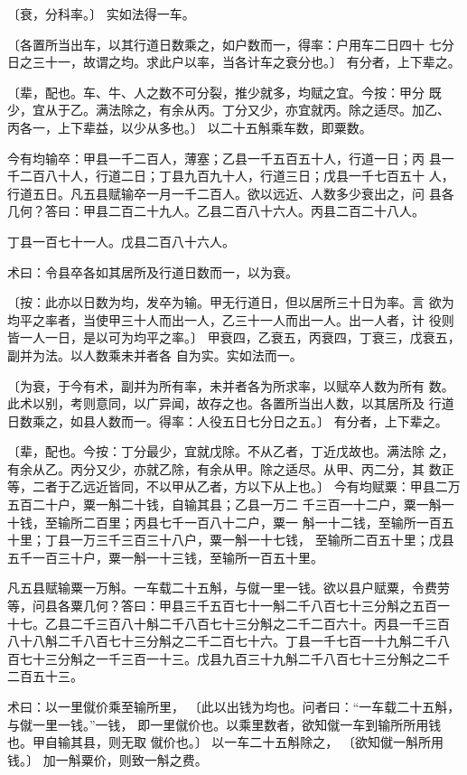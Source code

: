 \documentclass[a4paper,12pt,UTF8,twoside]{ctexbook}
\begin{document}
〔衰，分科率。〕 实如法得一车。

〔各置所当出车，以其行道日数乘之，如户数而一，得率：户用车二日四十 七分日之三十一，故谓之均。求此户以率，当各计车之衰分也。〕 有分者，上下辈之。

〔辈，配也。车、牛、人之数不可分裂，推少就多，均赋之宜。今按：甲分 既少，宜从于乙。满法除之，有余从丙。丁分又少，亦宜就丙。除之适尽。加乙、 丙各一，上下辈益，以少从多也。〕 以二十五斛乘车数，即粟数。

今有均输卒：甲县一千二百人，薄塞；乙县一千五百五十人，行道一日；丙 县一千二百八十人，行道二日；丁县九百九十人，行道三日；戊县一千七百五十 人，行道五日。凡五县赋输卒一月一千二百人。欲以远近、人数多少衰出之，问 县各几何？答曰：甲县二百二十九人。乙县二百八十六人。丙县二百二十八人。

丁县一百七十一人。戊县二百八十六人。

术曰：令县卒各如其居所及行道日数而一，以为衰。

〔按：此亦以日数为均，发卒为输。甲无行道日，但以居所三十日为率。言 欲为均平之率者，当使甲三十人而出一人，乙三十一人而出一人。出一人者，计 役则皆一人一日，是以可为均平之率。〕 甲衰四，乙衰五，丙衰四，丁衰三，戊衰五，副并为法。以人数乘未并者各 自为实。实如法而一。

〔为衰，于今有术，副并为所有率，未并者各为所求率，以赋卒人数为所有 数。此术以别，考则意同，以广异闻，故存之也。各置所当出人数，以其居所及 行道日数乘之，如县人数而一。得率：人役五日七分日之五。〕 有分者，上下辈之。

〔辈，配也。今按：丁分最少，宜就戊除。不从乙者，丁近戊故也。满法除 之，有余从乙。丙分又少，亦就乙除，有余从甲。除之适尽。从甲、丙二分，其 数正等，二者于乙远近皆同，不以甲从乙者，方以下从上也。〕 今有均赋粟：甲县二万五百二十户，粟一斛二十钱，自输其县；乙县一万二 千三百一十二户，粟一斛一十钱，至输所二百里；丙县七千一百八十二户，粟一 斛一十二钱，至输所一百五十里；丁县一万三千三百三十八户，粟一斛一十七钱， 至输所二百五十里；戊县五千一百三十户，粟一斛一十三钱，至输所一百五十里。

凡五县赋输粟一万斛。一车载二十五斛，与僦一里一钱。欲以县户赋粟，令费劳 等，问县各粟几何？答曰：甲县三千五百七十一斛二千八百七十三分斛之五百一 十七。乙县二千三百八十斛二千八百七十三分斛之二千二百六十。丙县一千三百 八十八斛二千八百七十三分斛之二千二百七十六。丁县一千七百一十九斛二千八 百七十三分斛之一千三百一十三。戊县九百三十九斛二千八百七十三分斛之二千 二百五十三。

术曰：以一里僦价乘至输所里， 〔此以出钱为均也。问者曰：“一车载二十五斛，与僦一里一钱。”一钱， 即一里僦价也。以乘里数者，欲知僦一车到输所所用钱也。甲自输其县，则无取 僦价也。〕 以一车二十五斛除之， 〔欲知僦一斛所用钱。〕 加一斛粟价，则致一斛之费。
\end{document}

